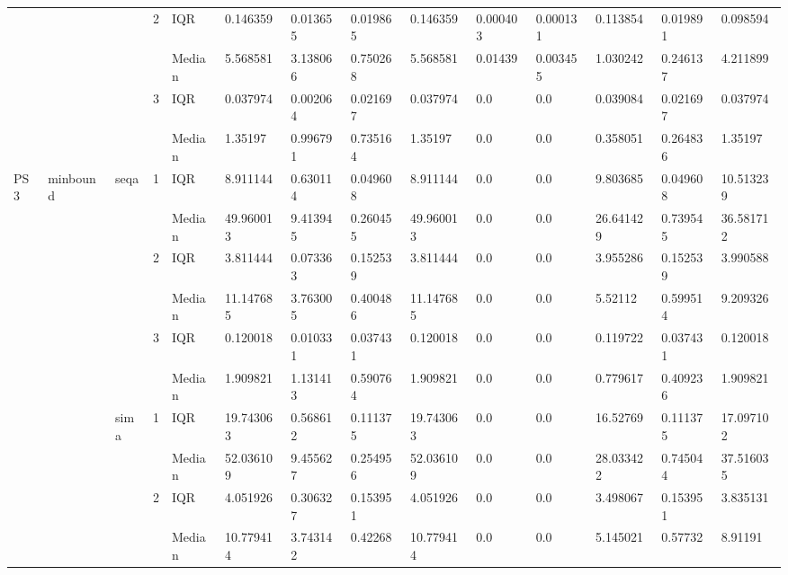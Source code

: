 \begin{tabular}{llllllllllllll}
    &       &      & 2 & IQR &   0.146359 &   0.013655 &  0.019865 &   0.146359 &  0.000403 &  0.000131 &   0.113854 &  0.019891 &   0.098594 \\
    &       &      &   & Median &   5.568581 &   3.138066 &  0.750268 &   5.568581 &   0.01439 &  0.003455 &   1.030242 &  0.246137 &   4.211899 \\
    &       &      & 3 & IQR &   0.037974 &   0.002064 &  0.021697 &   0.037974 &       0.0 &       0.0 &   0.039084 &  0.021697 &   0.037974 \\
    &       &      &   & Median &    1.35197 &   0.996791 &  0.735164 &    1.35197 &       0.0 &       0.0 &   0.358051 &  0.264836 &    1.35197 \\
PS3 & minbound & seqa & 1 & IQR &   8.911144 &   0.630114 &  0.049608 &   8.911144 &       0.0 &       0.0 &   9.803685 &  0.049608 &  10.513239 \\
    &       &      &   & Median &  49.960013 &   9.413945 &  0.260455 &  49.960013 &       0.0 &       0.0 &  26.641429 &  0.739545 &  36.581712 \\
    &       &      & 2 & IQR &   3.811444 &   0.073363 &  0.152539 &   3.811444 &       0.0 &       0.0 &   3.955286 &  0.152539 &   3.990588 \\
    &       &      &   & Median &  11.147685 &   3.763005 &  0.400486 &  11.147685 &       0.0 &       0.0 &    5.52112 &  0.599514 &   9.209326 \\
    &       &      & 3 & IQR &   0.120018 &   0.010331 &  0.037431 &   0.120018 &       0.0 &       0.0 &   0.119722 &  0.037431 &   0.120018 \\
    &       &      &   & Median &   1.909821 &   1.131413 &  0.590764 &   1.909821 &       0.0 &       0.0 &   0.779617 &  0.409236 &   1.909821 \\
    &       & sima & 1 & IQR &  19.743063 &   0.568612 &  0.111375 &  19.743063 &       0.0 &       0.0 &   16.52769 &  0.111375 &  17.097102 \\
    &       &      &   & Median &  52.036109 &   9.455627 &  0.254956 &  52.036109 &       0.0 &       0.0 &  28.033422 &  0.745044 &  37.516035 \\
    &       &      & 2 & IQR &   4.051926 &   0.306327 &  0.153951 &   4.051926 &       0.0 &       0.0 &   3.498067 &  0.153951 &   3.835131 \\
    &       &      &   & Median &  10.779414 &   3.743142 &   0.42268 &  10.779414 &       0.0 &       0.0 &   5.145021 &   0.57732 &    8.91191 \\

\end{tabular}
